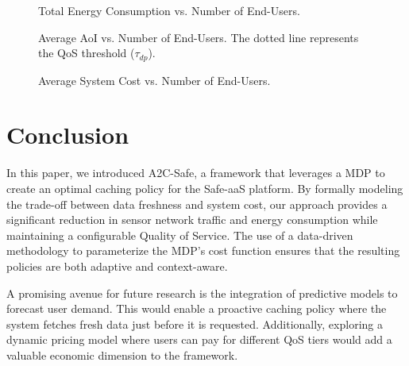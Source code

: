 \documentclass[journal]{IEEEtran}
\begin{document}
\begin{figure}[!t]
    \centering
    \caption{Total Energy Consumption vs. Number of End-Users.}
    \label{fig:results_energy}
\end{figure}

\begin{figure}[!t]
    \centering
    \caption{Average AoI vs. Number of End-Users. The dotted line represents the QoS threshold ($\tau_{dp}$).}
    \label{fig:results_aoi}
\end{figure}

\begin{figure}[!t]
    \centering
    \caption{Average System Cost vs. Number of End-Users.}
    \label{fig:results_penalty}
\end{figure}
\section{Conclusion}
In this paper, we introduced A2C-Safe, a framework that leverages a MDP to create an optimal caching policy for the Safe-aaS platform. By formally modeling the trade-off between data freshness and system cost, our approach provides a significant reduction in sensor network traffic and energy consumption while maintaining a configurable Quality of Service. The use of a data-driven methodology to parameterize the MDP's cost function ensures that the resulting policies are both adaptive and context-aware.

A promising avenue for future research is the integration of predictive models to forecast user demand. This would enable a proactive caching policy where the system fetches fresh data just before it is requested. Additionally, exploring a dynamic pricing model where users can pay for different QoS tiers would add a valuable economic dimension to the framework.


\end{document}
